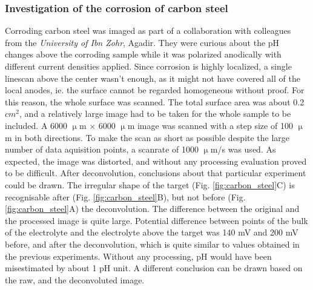 			\subsubsection{Investigation of the corrosion of carbon steel}
Corroding carbon steel was imaged as part of a collaboration with colleagues from the \emph{University of Ibn Zohr}, Agadir.
They were curious about the pH changes above the corroding sample while it was polarized anodically with different current densities applied.
Since corrosion is highly localized, a single linescan above the center wasn't enough, as it might not have covered all of the local anodes, ie. the surface cannot be regarded homogeneous without proof.
For this reason, the whole surface was scanned.
The total surface area was about 0.2 $cm^2$, and a relatively large image had to be taken for the whole sample to be included.
A 6000 $\upmu$m $\times$ 6000 $\upmu$m image was scanned with a step size of 100 $\upmu$m in both directions.
To make the scan as short as possible despite the large number of data aquisition points, a scanrate of 1000 $\upmu$m/s was used.
As expected, the image was distorted, and without any processing evaluation proved to be difficult.
After deconvolution, conclusions about that particular experiment could be drawn.
The irregular shape of the target (Fig. \ref{fig:carbon_steel}C) is recognisable after (Fig. \ref{fig:carbon_steel}B), but not before (Fig. \ref{fig:carbon_steel}A) the deconvolution.
The difference between the original and the processed image is quite large.
Potential difference between points of the bulk of the electrolyte and the electrolyte above the target was 140 mV and 200 mV before, and after the deconvolution, which is quite similar to values obtained in the previous experiments.
Without any processing, pH would have been misestimated by about 1 pH unit.
A different conclusion can be drawn based on the raw, and the deconvoluted image.

